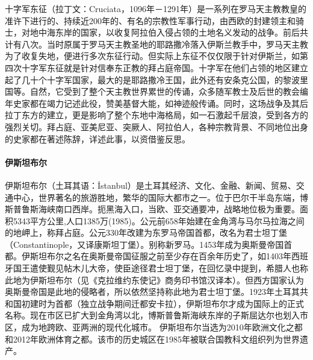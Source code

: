 \documentclass[letter]{book}
\begin{document}
十字军东征（拉丁文：Cruciata，1096年－1291年）是一系列在罗马天主教教皇的准许下进行的、持续近200年的、有名的宗教性军事行动，由西欧的封建领主和骑士，对地中海东岸的国家，以收复阿拉伯入侵占领的土地名义发动的战争。前后共计有八次。当时原属于罗马天主教圣地的耶路撒冷落入伊斯兰教手中，罗马天主教为了收复失地，便进行多次东征行动。但实际上东征不仅仅限于针对伊斯兰，如第四次十字军东征就是针对信奉东正教的拜占庭帝国。十字军在他们占领的地区建立起了几十个十字军国家，最大的是耶路撒冷王国，此外还有安条克公国，的黎波里国等。自然，它受到了整个天主教世界累世的传诵，众多随军教士及后世的教会编年史家都在竭力记述此役，赞美基督大能，如神迹般传诵。同时，这场战争及其后拉丁东方的建立，更是影响了整个东地中海格局，如一石激起千层浪，受到各方的强烈关切。拜占庭、亚美尼亚、突厥人、阿拉伯人，各种宗教背景、不同地位出身的史家都在著述陈辞，详述此事，以资借鉴反思。

\paragraph{伊斯坦布尔}

伊斯坦布尔（土耳其语：İstanbul）是土耳其经济、文化、金融、新闻、贸易、交通中心，世界著名的旅游胜地，繁华的国际大都市之一。位于巴尔干半岛东端，博斯普鲁斯海峡南口西岸。扼黑海入口，当欧、亚交通要冲，战略地位极为重要。面积5343平方公里,人口1385万(1985)。公元前658年始建在金角湾与马尔马拉海之间的地岬上，称拜占庭。公元330年改建为东罗马帝国首都，改名为君士坦丁堡（Constantinople，又译康斯坦丁堡）。别称新罗马。1453年成为奥斯曼帝国首都。伊斯坦布尔之名在奥斯曼帝国征服之前至少存在百余年历史了，如1403年西班牙国王遣使觐见帖木儿大帝，使臣途径君士坦丁堡，在回忆录中提到，希腊人也称此地为伊斯坦布尔（见《克拉维约东使记》商务印书馆汉译本）。但西方国家认为奥斯曼帝国是此地的侵略者，所以依然坚持称此地为君士坦丁堡。1923年土耳其共和国初建时为首都（独立战争期间迁都安卡拉），伊斯坦布尔才成为国际上的正式名称。现在市区已扩大到金角湾以北，博斯普鲁斯海峡东岸的子斯屈达尔也划入市区，成为地跨欧、亚两洲的现代化城市。
伊斯坦布尔当选为2010年欧洲文化之都和2012年欧洲体育之都。该市的历史城区在1985年被联合国教科文组织列为世界遗产。
\end{document}
